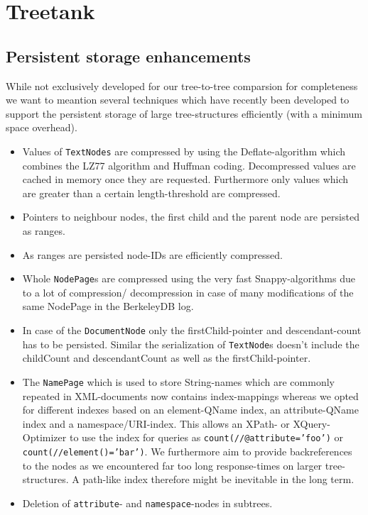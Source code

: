 \section{Treetank}\label{sec::treetank}

\subsection{Persistent storage enhancements}
While not exclusively developed for our tree-to-tree comparsion for completeness we want to meantion several techniques which have recently been developed to support the persistent storage of large tree-structures efficiently (with a minimum space overhead).

\begin{itemize}
\item Values of \texttt{TextNodes} are compressed by using the Deflate-algorithm which combines the LZ77 algorithm and Huffman coding. Decompressed values are cached in memory once they are requested. Furthermore only values which are greater than a certain length-threshold are compressed.
\item Pointers to neighbour nodes, the first child and the parent node are persisted as ranges.
\item As ranges are persisted node-IDs are efficiently compressed.
\item Whole \texttt{NodePage}s are compressed using the very fast Snappy-algorithms due to a lot of compression/ decompression in case of many modifications of the same NodePage in the BerkeleyDB log.
\item In case of the \texttt{DocumentNode} only the firstChild-pointer and descendant-count has to be persisted. Similar the serialization of \texttt{TextNode}s doesn't include the childCount and descendantCount as well as the firstChild-pointer.
\item The \texttt{NamePage} which is used to store String-names which are commonly repeated in XML-documents now contains index-mappings whereas we opted for different indexes based on an element-QName index, an attribute-QName index and a namespace/URI-index. This allows an XPath- or XQuery- Optimizer to use the index for queries as \texttt{count(//@attribute='foo')} or\\ \texttt{count(//element()='bar')}. We furthermore aim to provide backreferences to the nodes as we encountered far too long response-times on larger tree-structures. A path-like index therefore might be inevitable in the long term.
\item Deletion of \texttt{attribute}- and \texttt{namespace}-nodes in subtrees.
\end{itemize}

